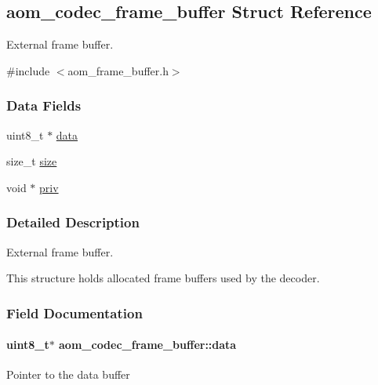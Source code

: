 \hypertarget{structaom__codec__frame__buffer}{}\subsection{aom\+\_\+codec\+\_\+frame\+\_\+buffer Struct Reference}
\label{structaom__codec__frame__buffer}


External frame buffer.  




{\ttfamily \#include $<$aom\+\_\+frame\+\_\+buffer.\+h$>$}

\subsubsection*{Data Fields}
\begin{DoxyCompactItemize}
\item 
uint8\+\_\+t $\ast$ \hyperlink{structaom__codec__frame__buffer_a4b73719e1d6756516de8cbceb68822d2}{data}
\item 
size\+\_\+t \hyperlink{structaom__codec__frame__buffer_a6fc24049c4e1706ce3a462825009f3d4}{size}
\item 
void $\ast$ \hyperlink{structaom__codec__frame__buffer_aa689f8e27421eebc9e1c70b607e415ef}{priv}
\end{DoxyCompactItemize}


\subsubsection{Detailed Description}
External frame buffer. 

This structure holds allocated frame buffers used by the decoder. 

\subsubsection{Field Documentation}
\paragraph[{\texorpdfstring{data}{data}}]{\setlength{\rightskip}{0pt plus 5cm}uint8\+\_\+t$\ast$ aom\+\_\+codec\+\_\+frame\+\_\+buffer\+::data}\hypertarget{structaom__codec__frame__buffer_a4b73719e1d6756516de8cbceb68822d2}{}\label{structaom__codec__frame__buffer_a4b73719e1d6756516de8cbceb68822d2}
Pointer to the data buffer 
